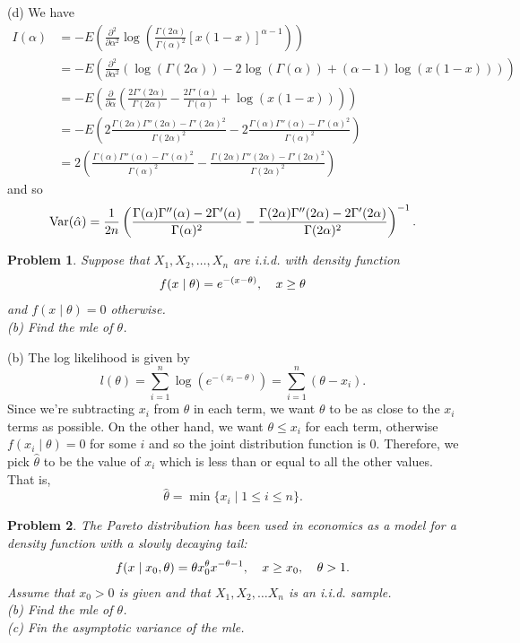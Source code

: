 \documentclass{article}
\newtheorem{problem}{Problem}
\newcommand{\var}{\textup{Var}}
\begin{document}
(d) We have
\begin{align*}
I(\alpha)
&= -E \left ( \frac{\partial^2}{\partial \alpha^2} \log \left ( \frac{\Gamma(2 \alpha)}{\Gamma(\alpha)^2}[x(1-x)]^{\alpha-1} \right ) \right )\\
&= -E \left ( \frac{\partial^2}{\partial \alpha^2} \left (\log(\Gamma(2 \alpha)) - 2\log(\Gamma(\alpha)) + (\alpha - 1) \log(x(1-x)) \right ) \right )\\
&= -E \left ( \frac{\partial}{\partial \alpha} \left ( \frac{2\Gamma'(2 \alpha)}{\Gamma(2\alpha)} - \frac{2 \Gamma'(\alpha)}{\Gamma(\alpha)} + \log(x (1-x)) \right ) \right )\\
&= -E \left ( 2 \frac{\Gamma(2 \alpha) \Gamma''(2 \alpha) - \Gamma'(2 \alpha)^2}{\Gamma(2 \alpha)^2} - 2 \frac{\Gamma(\alpha)\Gamma''(\alpha) - \Gamma'(\alpha)^2}{\Gamma(\alpha)^2} \right )\\
&= 2 \left ( \frac{\Gamma(\alpha)\Gamma''(\alpha) - \Gamma'(\alpha)^2}{\Gamma(\alpha)^2} - \frac{\Gamma(2 \alpha) \Gamma''(2 \alpha) - \Gamma'(2 \alpha)^2}{\Gamma(2 \alpha)^2} \right )
\end{align*}
and so
\[
\var(\hat{\alpha}) = \frac{1}{2n} \left ( \frac{\Gamma(\alpha)\Gamma''(\alpha) - 2\Gamma'(\alpha)}{\Gamma(\alpha)^2} - \frac{\Gamma(2 \alpha) \Gamma''(2 \alpha) - 2\Gamma'(2 \alpha)}{\Gamma(2 \alpha)^2} \right )^{-1}.
\]

\begin{problem}
Suppose that $X_1, X_2, \dots , X_n$ are i.i.d. with density function
\[
\begin{tabular}{cc}
$\displaystyle{f(x \mid \theta) = e^{-(x - \theta)}}$, & $\displaystyle{x \geq \theta}$
\end{tabular}
\]
and $f(x \mid \theta) = 0$ otherwise.\\
(b) Find the mle of $\theta$.
\end{problem}

(b) The log likelihood is given by
\[
l(\theta) = \sum_{i=1}^n \log \left (e^{-(x_i-\theta)} \right ) = \sum_{i=1}^n (\theta - x_i).
\]
Since we're subtracting $x_i$ from $\theta$ in each term, we want $\theta$ to be as close to the $x_i$ terms as possible. On the other hand, we want $\theta \leq x_i$ for each term, otherwise $f(x_i \mid \theta) = 0$ for some $i$ and so the joint distribution function is $0$. Therefore, we pick $\hat{\theta}$ to be the value of $x_i$ which is less than or equal to all the other values. That is,
\[
\hat{\theta} = \min \{x_i \mid 1 \leq i \leq n\}.
\]

\begin{problem}
The Pareto distribution has been used in economics as a model for a density function with a slowly decaying tail:
\[
\begin{tabular}{ccc}
$\displaystyle{f(x \mid x_0, \theta) = \theta x_0^{\theta} x^{-\theta - 1}}$, & $\displaystyle{x \geq x_0}$, & $\displaystyle{\theta > 1}$.
\end{tabular}
\]
Assume that $x_0 > 0$ is given and that $X_1, X_2, \dots X_n$ is an i.i.d. sample.\\
(b) Find the mle of $\theta$.\\
(c) Fin the asymptotic variance of the mle.
\end{problem}
\end{document}
